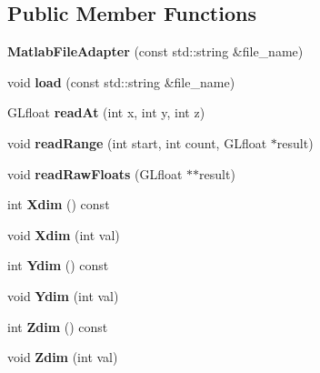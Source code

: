 \subsection*{Public Member Functions}
\begin{DoxyCompactItemize}
\item 
{\bfseries Matlab\-File\-Adapter} (const std\-::string \&file\-\_\-name)\label{classsfs__visualizer_1_1MatlabFileAdapter_a5b4a5db91581955e6063cfcb46a04b78}

\item 
void {\bfseries load} (const std\-::string \&file\-\_\-name)\label{classsfs__visualizer_1_1MatlabFileAdapter_a27ccc22fcca1f3ce06e633fe316f08e8}

\item 
G\-Lfloat {\bfseries read\-At} (int x, int y, int z)\label{classsfs__visualizer_1_1MatlabFileAdapter_abaa83da76f77d8a84d4af2c108ef7592}

\item 
void {\bfseries read\-Range} (int start, int count, G\-Lfloat $\ast$result)\label{classsfs__visualizer_1_1MatlabFileAdapter_ad73cb969daba9a56e8b43fa9e2b7ed19}

\item 
void {\bfseries read\-Raw\-Floats} (G\-Lfloat $\ast$$\ast$result)\label{classsfs__visualizer_1_1MatlabFileAdapter_a550e6a58ec5c6d1624b1b6599ff03f64}

\item 
int {\bfseries Xdim} () const \label{classsfs__visualizer_1_1MatlabFileAdapter_ad3eefbd67759fdffbd9ed68b0337f8e4}

\item 
void {\bfseries Xdim} (int val)\label{classsfs__visualizer_1_1MatlabFileAdapter_a88ca59682939f43f7774d2773989ce5b}

\item 
int {\bfseries Ydim} () const \label{classsfs__visualizer_1_1MatlabFileAdapter_ac495cea835c940f2796054235ffba7d0}

\item 
void {\bfseries Ydim} (int val)\label{classsfs__visualizer_1_1MatlabFileAdapter_abce516b08c67a0e8b0b6380bdcb402aa}

\item 
int {\bfseries Zdim} () const \label{classsfs__visualizer_1_1MatlabFileAdapter_aab3bd245cf446708ce46f9954cd854f5}

\item 
void {\bfseries Zdim} (int val)\label{classsfs__visualizer_1_1MatlabFileAdapter_a2009b0e8e6ee57265d5b0d7e36a8d0c4}

\end{DoxyCompactItemize}
